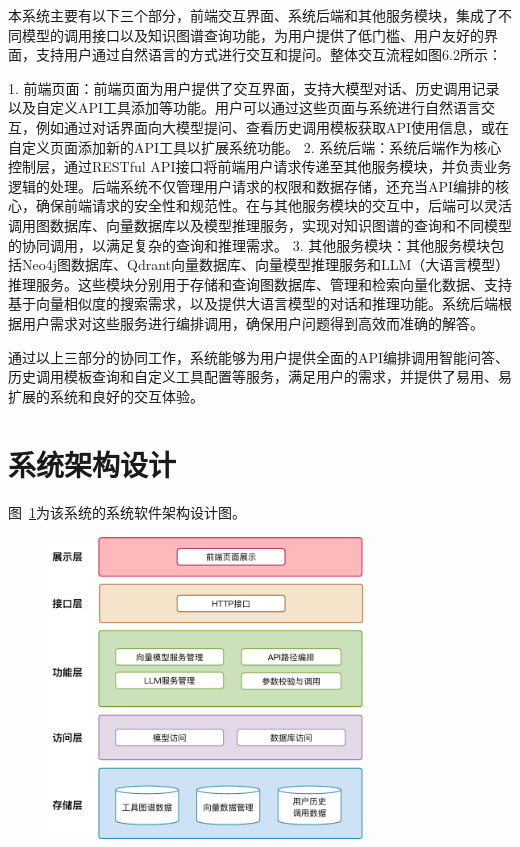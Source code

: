 本系统主要有以下三个部分，前端交互界面、系统后端和其他服务模块，集成了不同模型的调用接口以及知识图谱查询功能，为用户提供了低门槛、用户友好的界面，支持用户通过自然语言的方式进行交互和提问。整体交互流程如图6.2所示：

	1.	前端页面：前端页面为用户提供了交互界面，支持大模型对话、历史调用记录以及自定义API工具添加等功能。用户可以通过这些页面与系统进行自然语言交互，例如通过对话界面向大模型提问、查看历史调用模板获取API使用信息，或在自定义页面添加新的API工具以扩展系统功能。
	2.	系统后端：系统后端作为核心控制层，通过RESTful API接口将前端用户请求传递至其他服务模块，并负责业务逻辑的处理。后端系统不仅管理用户请求的权限和数据存储，还充当API编排的核心，确保前端请求的安全性和规范性。在与其他服务模块的交互中，后端可以灵活调用图数据库、向量数据库以及模型推理服务，实现对知识图谱的查询和不同模型的协同调用，以满足复杂的查询和推理需求。
	3.	其他服务模块：其他服务模块包括Neo4j图数据库、Qdrant向量数据库、向量模型推理服务和LLM（大语言模型）推理服务。这些模块分别用于存储和查询图数据库、管理和检索向量化数据、支持基于向量相似度的搜索需求，以及提供大语言模型的对话和推理功能。系统后端根据用户需求对这些服务进行编排调用，确保用户问题得到高效而准确的解答。

通过以上三部分的协同工作，系统能够为用户提供全面的API编排调用智能问答、历史调用模板查询和自定义工具配置等服务，满足用户的需求，并提供了易用、易扩展的系统和良好的交互体验。

\section{系统架构设计}

图~\ref{fig:system}为该系统的系统软件架构设计图。

\begin{figure}[!htp]
    \vspace{1em}
    \centering
    \setlength{\abovecaptionskip}{10pt} %
    \includegraphics[height=8cm]{../assets/ch5-系统架构图.pdf}
    \label{fig:system}
  \end{figure}

